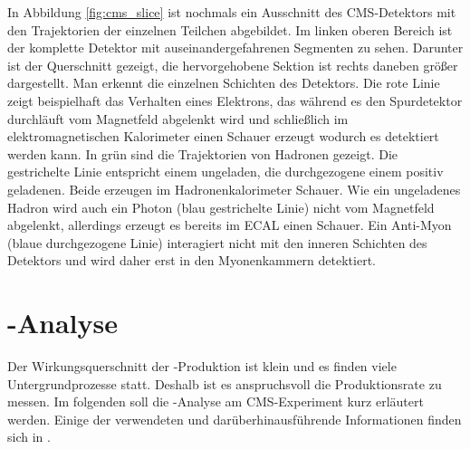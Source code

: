 In Abbildung \ref{fig:cms_slice} ist nochmals ein Ausschnitt des CMS-Detektors mit den Trajektorien der einzelnen Teilchen abgebildet. Im linken oberen Bereich ist der komplette Detektor mit auseinandergefahrenen Segmenten zu sehen. Darunter ist der Querschnitt gezeigt, die hervorgehobene Sektion ist rechts daneben gr\"o\ss er dargestellt. Man erkennt die einzelnen Schichten des Detektors. Die rote Linie zeigt beispielhaft das Verhalten eines Elektrons, das w\"ahrend es den Spurdetektor durchl\"auft vom Magnetfeld abgelenkt wird und schlie\ss lich im elektromagnetischen Kalorimeter einen Schauer erzeugt wodurch es detektiert werden kann. In gr\"un sind die Trajektorien von Hadronen gezeigt. Die gestrichelte Linie entspricht einem ungeladen, die durchgezogene einem positiv geladenen. Beide erzeugen im Hadronenkalorimeter Schauer. Wie ein ungeladenes Hadron wird auch ein Photon (blau gestrichelte Linie) nicht vom Magnetfeld abgelenkt, allerdings erzeugt es bereits im ECAL einen Schauer. Ein Anti-Myon (blaue durchgezogene Linie) interagiert nicht mit den inneren Schichten des Detektors und wird daher erst in den Myonenkammern detektiert.

\section{\ttH-Analyse}
\label{ch:Experiment:sec:ttH}

Der Wirkungsquerschnitt der \ttH-Produktion ist klein und es finden viele Untergrundprozesse statt. Deshalb ist es anspruchsvoll die Produktionsrate zu messen. Im folgenden soll die \ttH-Analyse am CMS-Experiment kurz erl\"autert werden. Einige der verwendeten und dar\"uberhinausf\"uhrende Informationen finden sich in \cite{Khachatryan:2014qaa}.

